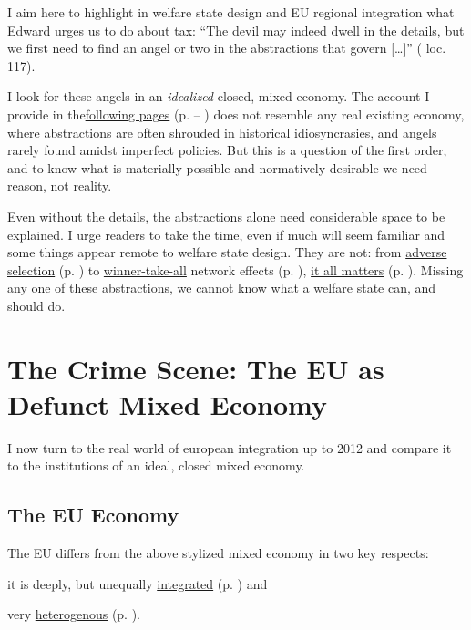 \documentclass[11pt,a4paper,oneside,openright]{article}
\begin{document}
I aim here to highlight in welfare state design and \gls{EU} regional integration what Edward \citeauthor{McCaffery2002} urges us to do about tax: 
``The devil may indeed dwell in the details, but we first need to find an angel or two in the abstractions that govern [\ldots]'' (\citeyear{McCaffery2002} loc. 117). 

I look for these angels in an \emph{idealized} closed, mixed economy. 
The account I provide in the\hyperref[sec:mixed_economy]{following pages} (p. \pageref{sec:mixed_economy} -- \pageref{sec:EU_reality}) does not resemble any real existing economy, where abstractions are often shrouded in historical idiosyncrasies, and angels rarely found amidst imperfect policies. 
But this is a question of the first order, and to know what is materially possible and normatively desirable we need reason, not reality.

Even without the details, the abstractions alone need considerable space to be explained. 
I urge readers to take the time, even if much will seem familiar and some things appear remote to welfare state design. 
They are not: 
from \hyperref[sec:adverse_selection]{adverse selection} (p. \pageref{sec:adverse_selection}) to \hyperref[sec:winner-take-all]{winner-take-all} network effects (p. \pageref{sec:winner-take-all}), \hyperref[sec:why_mixed_economy_matters]{it all matters} (p. \pageref{sec:why_mixed_economy_matters}). 
Missing any one of these abstractions, we cannot know what a welfare state can, and should do.


\section{The Crime Scene: The EU as Defunct Mixed Economy} \label{sec:EU_reality}
I now turn to the real world of european integration up to 2012 and compare it to the institutions of an ideal, closed mixed economy.
	
	\subsection{The EU Economy}
The \gls{EU} differs from the above stylized mixed economy in two key respects:
\begin{inparaenum}[1)] 
	\item it is deeply, but unequally \hyperref[sec:EU_Acquis]{integrated} (p. \pageref{sec:EU_Acquis}) and 
	\item very \hyperref[sec:sources_of_wealth]{heterogenous} (p. \pageref{sec:sources_of_wealth}).
\end{inparaenum}
\end{document}
